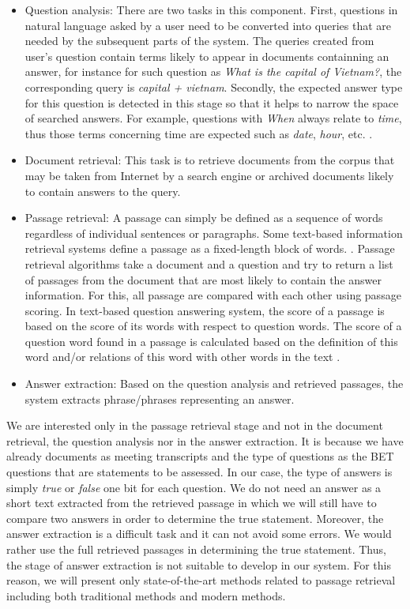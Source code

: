 \begin{itemize}
\item {Question analysis: There are two tasks in this component. First, questions in natural language asked by a user need to be converted into queries that are needed by the subsequent parts of the system. The queries created from user's question contain terms likely to appear in documents containning an answer, for instance for such question as \textit{What is the capital of Vietnam?}, the corresponding query is \textit{capital + vietnam}. Secondly, the expected answer type for this question is detected in this stage so that it helps to narrow the space of searched answers. For example, questions with \textit{When} always relate to \textit{time}, thus those terms concerning time are expected such as \textit{date}, \textit{hour}, etc. }.
\item {Document retrieval: This task is to retrieve documents from the corpus that may be taken from Internet by a search engine or archived documents likely to contain answers to the query.}
\item {Passage retrieval: A passage can simply be defined as a sequence of words regardless of individual sentences or paragraphs. Some text-based information retrieval systems define a passage as a fixed-length block of words. \cite{goharian2008dsp}. Passage retrieval algorithms take a document and a question and try to return a list of passages from the document that are most likely to contain the answer information. For this,  all passage are compared with each other using passage scoring. In text-based question answering system, the score of a passage is based on the score of its words with respect to question words. The score of a question word found in a passage is calculated based on the definition of this word and/or relations of this word with other words in the text \cite{tellex2003qep}.}
\item {Answer extraction: Based on the question analysis and retrieved passages, the system extracts phrase/phrases representing an answer.}
\end{itemize}

We are interested only in the passage retrieval stage and not in the document retrieval, the question analysis nor in the answer extraction. It is because we have already documents as meeting transcripts and the type of questions as the BET questions that are statements to be assessed. In our case, the type of answers is simply \textit{true} or \textit{false} one bit for each question. We do not need an answer as a short text extracted from the retrieved passage in which we will still have to compare two answers in order to determine the true statement. Moreover, the answer extraction is a difficult task and it can not avoid some errors. We would rather use the full retrieved passages in determining the true statement. Thus, the stage of answer extraction is not suitable to develop in our system. For this reason, we will present only state-of-the-art methods related to passage retrieval including both traditional methods and modern methods.


